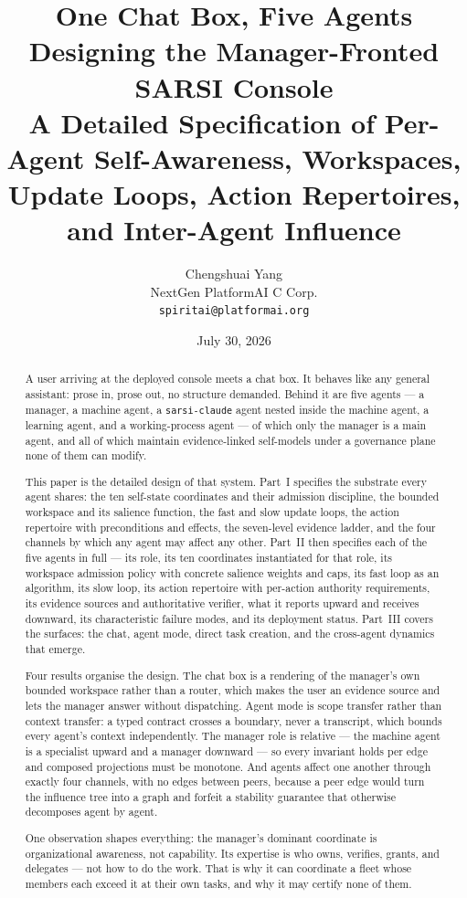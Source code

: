 \documentclass[11pt]{article}
\title{\LARGE One Chat Box, Five Agents\\[6pt]
\Large Designing the Manager-Fronted SARSI Console\\[4pt]
\large A Detailed Specification of Per-Agent Self-Awareness, Workspaces,\\
\large Update Loops, Action Repertoires, and Inter-Agent Influence}
\author{Chengshuai Yang\\
\small NextGen PlatformAI C Corp.\\
\small \texttt{spiritai@platformai.org}}
\date{July 30, 2026}
\newcommand{\code}[1]{\texttt{\small #1}}
\begin{document}
\maketitle
\thispagestyle{empty}

\begin{abstract}
\noindent
A user arriving at the deployed console meets a chat box. It behaves like any general assistant: prose in, prose out, no structure demanded. Behind it are five agents --- a manager, a machine agent, a \code{sarsi-claude} agent nested inside the machine agent, a learning agent, and a working-process agent --- of which only the manager is a main agent, and all of which maintain evidence-linked self-models under a governance plane none of them can modify.

This paper is the detailed design of that system. Part~I specifies the substrate every agent shares: the ten self-state coordinates and their admission discipline, the bounded workspace and its salience function, the fast and slow update loops, the action repertoire with preconditions and effects, the seven-level evidence ladder, and the four channels by which any agent may affect any other. Part~II then specifies each of the five agents in full --- its role, its ten coordinates instantiated for that role, its workspace admission policy with concrete salience weights and caps, its fast loop as an algorithm, its slow loop, its action repertoire with per-action authority requirements, its evidence sources and authoritative verifier, what it reports upward and receives downward, its characteristic failure modes, and its deployment status. Part~III covers the surfaces: the chat, agent mode, direct task creation, and the cross-agent dynamics that emerge.

Four results organise the design. The chat box is a rendering of the manager's own bounded workspace rather than a router, which makes the user an evidence source and lets the manager answer without dispatching. Agent mode is scope transfer rather than context transfer: a typed contract crosses a boundary, never a transcript, which bounds every agent's context independently. The manager role is relative --- the machine agent is a specialist upward and a manager downward --- so every invariant holds per edge and composed projections must be monotone. And agents affect one another through exactly four channels, with no edges between peers, because a peer edge would turn the influence tree into a graph and forfeit a stability guarantee that otherwise decomposes agent by agent.

One observation shapes everything: the manager's dominant coordinate is organizational awareness, not capability. Its expertise is who owns, verifies, grants, and delegates --- not how to do the work. That is why it can coordinate a fleet whose members each exceed it at their own tasks, and why it may certify none of them.
\end{abstract}
\end{document}

